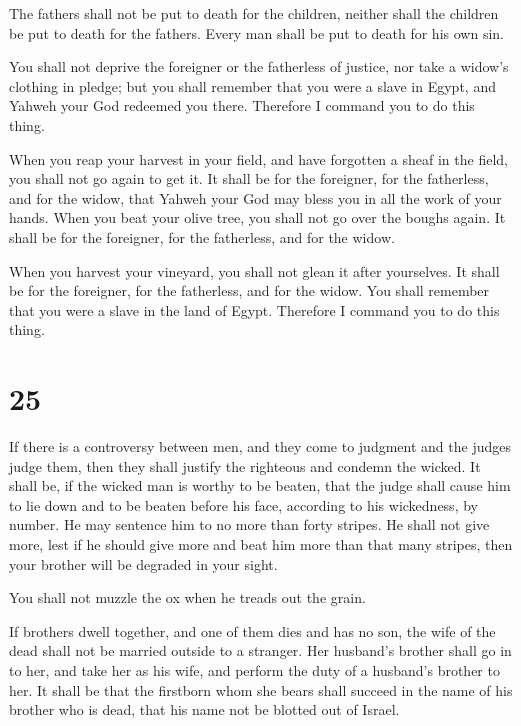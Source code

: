  The fathers shall not be put to death for the children,
neither shall the children be put to death for the fathers. Every man
shall be put to death for his own sin.

 You shall not deprive the foreigner or the fatherless of
justice, nor take a widow's clothing in pledge;  but you
shall remember that you were a slave in Egypt, and Yahweh your God
redeemed you there. Therefore I command you to do this thing.

 When you reap your harvest in your field, and have
forgotten a sheaf in the field, you shall not go again to get it. It
shall be for the foreigner, for the fatherless, and for the widow, that
Yahweh your God may bless you in all the work of your hands.
 When you beat your olive tree, you shall not go over the
boughs again. It shall be for the foreigner, for the fatherless, and for
the widow.

 When you harvest your vineyard, you shall not glean it
after yourselves. It shall be for the foreigner, for the fatherless, and
for the widow.  You shall remember that you were a slave in
the land of Egypt. Therefore I command you to do this thing.

\hypertarget{section-24}{%
\section{25}\label{section-24}}

 If there is a controversy between men, and they come to
judgment and the judges judge them, then they shall justify the
righteous and condemn the wicked.  It shall be, if the
wicked man is worthy to be beaten, that the judge shall cause him to lie
down and to be beaten before his face, according to his wickedness, by
number.  He may sentence him to no more than forty stripes.
He shall not give more, lest if he should give more and beat him more
than that many stripes, then your brother will be degraded in your
sight.

 You shall not muzzle the ox when he treads out the grain.

 If brothers dwell together, and one of them dies and has no
son, the wife of the dead shall not be married outside to a stranger.
Her husband's brother shall go in to her, and take her as his wife, and
perform the duty of a husband's brother to her.  It shall be
that the firstborn whom she bears shall succeed in the name of his
brother who is dead, that his name not be blotted out of Israel.

